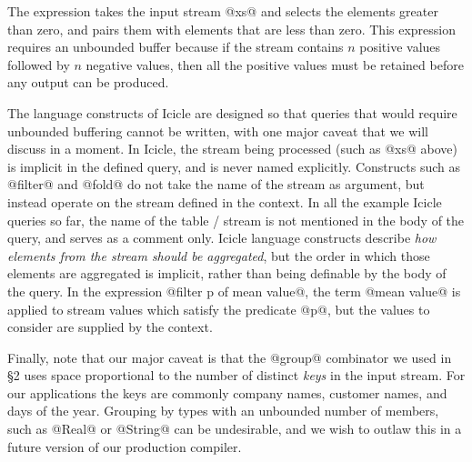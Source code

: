 The expression takes the input stream @xs@ and selects the elements greater than zero, and pairs them with elements that are less than zero. This expression requires an unbounded buffer because if the stream contains $n$ positive values followed by $n$ negative values, then all the positive values must be retained before any output can be produced. 

The language constructs of Icicle are designed so that queries that would require unbounded buffering cannot be written, with one major caveat that we will discuss in a moment. In Icicle, the stream being processed (such as @xs@ above) is implicit in the defined query, and is never named explicitly. Constructs such as @filter@ and @fold@ do not take the name of the stream as argument, but instead operate on the stream defined in the context. In all the example Icicle queries so far, the name of the table / stream is not mentioned in the body of the query, and serves as a comment only. Icicle language constructs describe \emph{how elements from the stream should be aggregated}, but the order in which those elements are aggregated is implicit, rather than being definable by the body of the query. In the expression @filter p of mean value@, the term @mean value@ is applied to stream values which satisfy the predicate @p@, but the values to consider are supplied by the context.

Finally, note that our major caveat is that the @group@ combinator we used in \S2 uses space proportional to the number of distinct \emph{keys} in the input stream.
For our applications the keys are commonly company names, customer names, and days of the year.
Grouping by types with an unbounded number of members, such as @Real@ or @String@ can be undesirable, and we wish to outlaw this in a future version of our production compiler.






